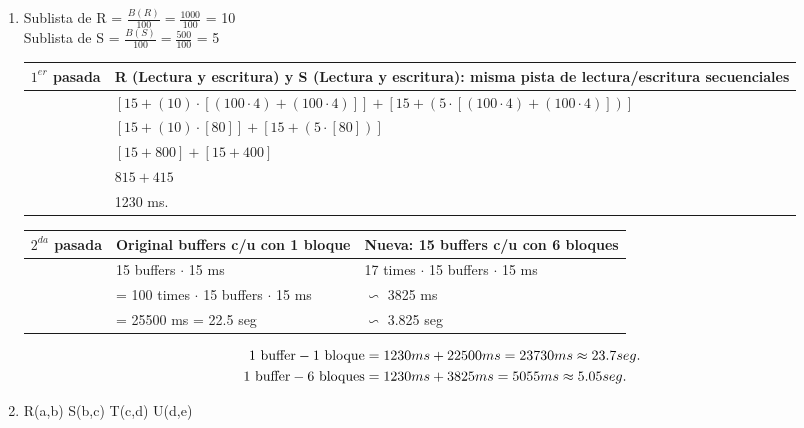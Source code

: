 \documentclass{templateNote}
\begin{document}
\begin{enumerate}
\begin{enumerate}[label=\alph*)]
        \item Sublista de R = $\frac{B(R)}{100} = \frac{1000}{100}$ = 10 \\
        Sublista de S = $\frac{B(S)}{100} = \frac{500}{100}$ = 5 \\

        \begin{tabular}{|m{2cm}|m{10cm}|}
            \hline
            $1^{er}$ pasada & R (Lectura y escritura) y S (Lectura y escritura): misma pista de lectura/escritura secuenciales \\
            \hline
            & $[15+(10)\cdot[(100\cdot4)+(100\cdot4)]]+[15+(5\cdot[(100\cdot4)+(100\cdot4)])]$ \\ 
            & $[15+(10)\cdot[80]]+[15+(5\cdot[80])]$ \\
            & $[15+800]+[15+400]$ \\
            & $815+415$ \\
            & 1230 ms. \\
            \hline
        \end{tabular}

        \begin{tabular}{|m{2cm}|m{6cm}|m{6cm}|}
            \hline
            $2^{da}$ pasada & Original \newline 15 buffers c/u con 1 bloque & Nueva: 15 buffers c/u con 6 bloques\\
            \hline
            & 15 buffers $\cdot$ 15 ms & 17 times $\cdot$ 15 buffers $\cdot$ 15 ms \\
            & = 100 times $\cdot$ 15 buffers $\cdot$ 15 ms & $\backsim$ 3825 ms \\
            & = 25500 ms = 22.5 seg & $\backsim$ 3.825 seg\\
            \hline
        \end{tabular}
        
        \begin{align*}
            1 \textnormal{ buffer} - 1 \textnormal{ bloque} &= 1230 ms + 22500 ms = 23730 ms \approx 23.7 seg.\\
            1 \textnormal{ buffer} - 6 \textnormal{ bloques} &= 1230 ms + 3825 ms = 5055 ms \approx 5.05 seg.\\
        \end{align*}

        \item R(a,b) S(b,c) T(c,d) U(d,e)\\
        

\end{enumerate}
\end{enumerate}
\end{document}
